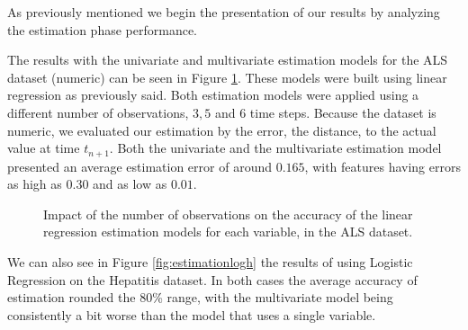 As previously mentioned we begin the presentation of our results by analyzing the estimation phase performance.

The results with the univariate and multivariate estimation models for the ALS dataset (numeric) can be seen in 
Figure \ref{fig:estimationals}. These models were built using linear regression as previously said. Both estimation models were 
applied using a different number of observations, $3, 5$ and $6$ time steps.
 Because the dataset is numeric, we evaluated our estimation by the error, the distance, to the actual value at time $t_{n+1}$.
 Both the univariate and the multivariate estimation model presented an average estimation error of around $0.165$, with
 features having errors as high as $0.30$ and as low as $0.01$.
  
\begin{figure}[h]
	\begin{subfigmatrix}{2}
  \end{subfigmatrix}
  \caption{Impact of the number of observations on the accuracy of the linear regression estimation models for each variable, in the ALS dataset.}
  \label{fig:estimationals}
\end{figure}

We can also see in Figure \ref{fig:estimationlogh} the results of using Logistic Regression on the
 Hepatitis dataset. In both cases the average accuracy of estimation rounded the 80\% range, with the multivariate model being consistently
 a bit worse than the model that uses a single variable.
 
